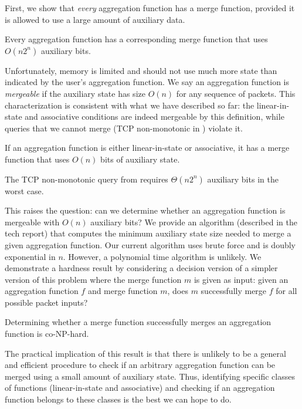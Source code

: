 First, we show that \emph{every} aggregation function has a merge function,
provided it is allowed to use a large amount of auxiliary data.
\begin{theorem}
Every aggregation function has a corresponding merge function that uses
$O(n2^n)$ auxiliary bits.
\end{theorem}
\noindent
Unfortunately, memory is limited and \TheSystem should not use much more state
than indicated by the user's aggregation function.  We say an aggregation
function is \emph{mergeable} if the auxiliary state has size $O(n)$ for any
sequence of packets.  This characterization is consistent with what we
have described so far:
%
the linear-in-state and associative
conditions are indeed mergeable by this definition, while queries that we
cannot merge (\eg TCP non-monotonic in ) violate it.
\begin{theorem}
If an aggregation function is either linear-in-state or associative, it has a merge function
that uses $O(n)$ bits of auxiliary state.
\end{theorem}
\begin{theorem}
The TCP non-monotonic query from  requires $\Theta(n2^n)$ auxiliary bits
in the worst case.
\end{theorem}
\noindent
This raises the question: can we determine whether an aggregation function is
mergeable with $O(n)$ auxiliary bits? We provide an algorithm (described in the
tech report) that computes the minimum auxiliary state size needed to merge a
given aggregation function. Our current algorithm uses brute force and is
doubly exponential in $n$. However, a
polynomial time algorithm is unlikely. We demonstrate a hardness result by
considering a decision version of a simpler version of this problem where the
merge function $m$ is given as input: given an aggregation function $f$ and
merge function $m$, does $m$ successfully merge $f$ for all possible packet
inputs?
\begin{theorem}
Determining whether a merge function successfully merges an aggregation function
is co-NP-hard.
\end{theorem}

The practical implication of this result is that there is unlikely to be a
general and efficient procedure to check if an arbitrary aggregation function
can be merged using a small amount of auxiliary state. Thus, identifying
specific classes of functions (\eg linear-in-state and associative) and
checking if an aggregation function belongs to these classes is the best we can
hope to do.

